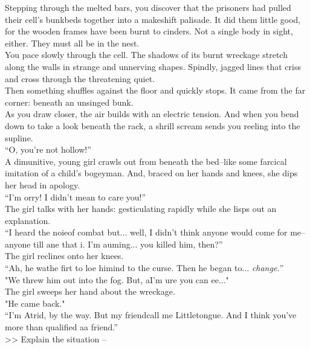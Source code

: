Stepping through the melted bars, you discover that the prisoners had pulled their cell’s bunkbeds together into a makeshift palisade. It did them little good, for the wooden frames have been burnt to cinders. Not a single body in sight, either. They must all be in the nest.\\

You pace slowly through the cell. The shadows of its burnt wreckage stretch along the walls in strange and unnerving shapes. Spindly, jagged lines that criss and cross through the threatening quiet.\\

Then something shuffles against the floor and quickly stops. It came from the far corner: beneath an unsinged bunk.\\

As you draw closer, the air builds with an electric tension. And when you bend down to take a look beneath the rack, a shrill scream sends you reeling into the supline.\\

“O, you’re not hollow!”\\

A dimunitive, young girl crawls out from beneath the bed--like some farcical imitation of a child’s bogeyman. And, braced on her hands and knees, she dips her head in apology.\\

“I’m \lisp orry! I didn’t mean to \lisp care you!”\\

The girl talks with her hands: gesticulating rapidly while she lisps out an explanation.\\

“I heard the noi\lisp e\lispx of combat but... well, I didn’t think anyone would come for me--anyone \lisp till \lisp ane that i\lisp . I’m a\lisp uming... you killed him, then?”\\

The girl reclines onto her knees.\\
“Ah, he wa\lispx the fir\lisp t to lo\lisp e hi\lispx mind to the curse. Then he began to... \emph{change.}”\\

"We threw him out into the fog. But, a\lispx I'm \lisp ure you can \lisp ee..."\\

The girl sweeps her hand about the wreckage.\\
"He came back."\\

“I’m A\lisp trid, by the way. But my friend\lispx call me Littletongue. And I think you’ve more than qualified a\lispx a friend.”\\

>> Explain the situation -- 